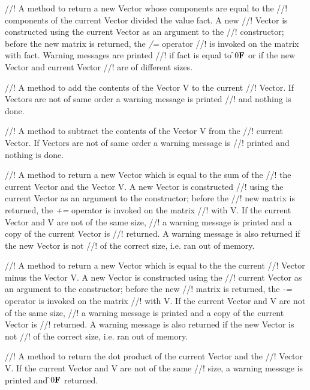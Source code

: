 //! A method to return a new Vector whose components are equal to the
//! components of the current Vector divided the value \p fact. A new
//! Vector is constructed using the current Vector as an argument to the
//! constructor; before the new matrix is returned, the {\em /=} operator
//! is invoked on the matrix with \p fact. Warning messages are printed
//! if \p fact is equal to \f$0{\bf F}$ or if the new Vector and current Vector
//! are of different sizes. 

//! A method to add the contents of the Vector \p V to the current
//! Vector. If Vectors are not of same order a warning message is printed
//! and nothing is done. 

//! A method to subtract the contents of the Vector \p V from the
//! current Vector. If Vectors are not of same order a warning message is
//! printed and nothing is done. 


//! A method to return a new Vector which is equal to the sum of the
//! the current Vector and the Vector \p V. A new Vector is constructed
//! using the current Vector as an argument to the constructor; before the
//! new matrix is returned, the {\em +=} operator is invoked on the matrix
//! with \p V. If the current Vector and \p V are not of the same size,
//! a warning message is printed and a copy of the current Vector is
//! returned. A warning message is also returned if the new Vector is not
//! of the correct size, i.e. ran out of memory. 


//! A method to return a new Vector which is equal to the the current
//! Vector minus the Vector \p V. A new Vector is constructed using the
//! current Vector as an argument to the constructor; before the new
//! matrix is returned, the {\em -=} operator is invoked on the matrix
//! with \p V. If the current Vector and \p V are not of the same size,
//! a warning message is printed and a copy of the current Vector is
//! returned. A warning message is also returned if the new Vector is not
//! of the correct size, i.e. ran out of memory. 


//! A method to return the dot product of the current Vector and the
//! Vector \p V. If the current Vector and \p V are not of the same
//! size, a warning message is printed and \f$0{\bf F}$ returned. 

